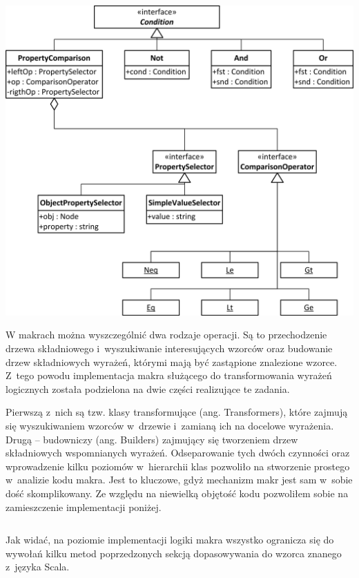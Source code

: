 \documentclass{xmgr}
\begin{document}
\begin{center}
	\includegraphics[scale=1]{images/conditions-uml.png}
\end{center}

W makrach można wyszczególnić dwa rodzaje operacji. Są to przechodzenie drzewa składniowego i~wyszukiwanie interesujących wzorców oraz budowanie drzew składniowych wyrażeń, którymi mają być zastąpione znalezione wzorce. Z~tego powodu implementacja makra służącego do transformowania wyrażeń logicznych została podzielona na dwie części realizujące te zadania.

Pierwszą z~nich są tzw. klasy transformujące (ang. Transformers), które zajmują się wyszukiwaniem wzorców w~drzewie i~zamianą ich na docelowe wyrażenia. Drugą -- budowniczy (ang. Builders) zajmujący się tworzeniem drzew składniowych wspomnianych wyrażeń. Odseparowanie tych dwóch czynności oraz wprowadzenie kilku poziomów w~hierarchii klas pozwoliło na stworzenie prostego w~analizie kodu makra. Jest to kluczowe, gdyż mechanizm makr jest sam w~sobie dość skomplikowany.  Ze względu na niewielką objętość kodu pozwoliłem sobie na zamieszczenie implementacji poniżej.

\inputminted{scala}{listings/scala/boolean-macro-implementation.scala}

Jak widać, na poziomie implementacji logiki makra wszystko ogranicza się do wywołań kilku metod poprzedzonych sekcją dopasowywania do wzorca znanego z~języka Scala.
\end{document}

